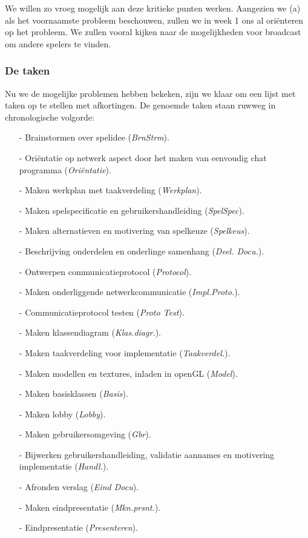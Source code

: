 \documentclass[a4paper,11pt, twoside]{article}
\newcommand{\BS}{BrnStrm}
\newcommand{\ON}{Ori\"entatie}
\newcommand{\MW}{Werkplan}
\newcommand{\MS}{SpelSpec}
\newcommand{\MA}{Spelkeus}
\newcommand{\BO}{Deel. Docu.}
\newcommand{\OC}{Protocol}
\newcommand{\MN}{Impl.Proto.}
\newcommand{\CT}{Proto Test}
\newcommand{\MK}{Klas.diagr.}
\newcommand{\MT}{Taakverdel.}
\newcommand{\BG}{Handl.}
\newcommand{\AV}{Eind Docu}
\newcommand{\ME}{Mkn.prsnt.}
\newcommand{\EP}{Presenteren}
\begin{document}
    We willen zo vroeg mogelijk aan deze kritieke punten werken. Aangezien we (a) als het voornaamste probleem beschouwen, zullen we in week 1 ons al ori\"enteren op het probleem. We zullen vooral kijken naar de mogelijkheden voor broadcast om andere spelers te vinden.
    
    \subsubsection{De taken}
    Nu we de mogelijke problemen hebben bekeken, zijn we klaar om een lijst met taken op te stellen met afkortingen. De genoemde taken staan ruwweg in chronologische volgorde:
    \begin{enumerate}
    \item[-] Brainstormen over spelidee (\emph{\BS}).
    \item[-] Ori\"entatie op netwerk aspect door het maken van eenvoudig chat programma (\emph{\ON}).
    \item[-] Maken werkplan met taakverdeling (\emph{\MW}).
    \item[-] Maken spelspecificatie en gebruikershandleiding (\emph{\MS}).
    \item[-] Maken alternatieven en motivering van spelkeuze (\emph{\MA}).
    \item[-] Beschrijving onderdelen en onderlinge samenhang (\emph{\BO}).
    \item[-] Ontwerpen communicatieprotocol (\emph{\OC}).
    \item[-] Maken onderliggende netwerkcommunicatie (\emph{\MN}).
    \item[-] Communicatieprotocol testen (\emph{\CT}).
    \item[-] Maken klassendiagram (\emph{\MK}).
    \item[-] Maken taakverdeling voor implementatie (\emph{\MT}).
    \item[-] Maken modellen en textures, inladen in openGL (\emph{Model}).
    \item[-] Maken basisklassen (\emph{Basis}).
    \item[-] Maken lobby (\emph{Lobby}).
    \item[-] Maken gebruikersomgeving (\emph{Gbr}).    
    \item[-] Bijwerken gebruikershandleiding, validatie aannames en motivering implementatie (\emph{\BG}).
    \item[-] Afronden verslag (\emph{\AV}).
    \item[-] Maken eindpresentatie (\emph{\ME}).
    \item[-] Eindpresentatie (\emph{\EP}).
    \end{enumerate}
\end{document}
